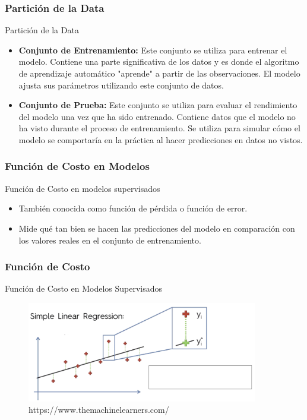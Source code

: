 \documentclass{beamer}
\begin{document}
	
	
	\begin{frame}
		\frametitle{Partición de la Data}
				\begin{block}{Partición de la Data}	
		\begin{itemize}
		\item  \textbf{Conjunto de Entrenamiento:} 
		Este conjunto se utiliza para entrenar el modelo. Contiene una parte significativa de los datos y es donde el algoritmo de aprendizaje automático "aprende" a partir de las observaciones. El modelo ajusta sus parámetros utilizando este conjunto de datos.
		\item \textbf{ Conjunto de Prueba:} 
		Este conjunto se utiliza para evaluar el rendimiento del modelo una vez que ha sido entrenado. Contiene datos que el modelo no ha visto durante el proceso de entrenamiento. Se utiliza para simular cómo el modelo se comportaría en la práctica al hacer predicciones en datos no vistos.
			\end{itemize}
				\end{block}
\end{frame}

\begin{frame}
	\frametitle{Función de Costo en Modelos}
			\begin{block}{Función de Costo en modelos supervisados}	
	\begin{itemize}
		\item También conocida como función de pérdida o función de error.
		\item Mide qué tan bien se hacen las predicciones del modelo en comparación con los valores reales en el conjunto de entrenamiento.
	\end{itemize}
		\end{block}
\end{frame}

\begin{frame}
	\frametitle{Función de Costo}
	\begin{block}{Función de Costo en Modelos Supervisados}	
		\begin{figure}
	\includegraphics[width=0.9\textwidth]{funcion_coste}
	\caption{https://www.themachinelearners.com/}
\end{figure}
	\end{block}
\end{frame}
\end{document}
